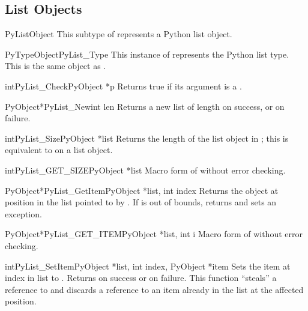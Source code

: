 \documentclass{manual}
\begin{document}
\subsection{List Objects \label{listObjects}}

\begin{ctypedesc}{PyListObject}
This subtype of  represents a Python list object.
\end{ctypedesc}

\begin{cvardesc}{PyTypeObject}{PyList_Type}
This instance of  represents the Python list
type.  This is the same object as .
\end{cvardesc}

\begin{cfuncdesc}{int}{PyList_Check}{PyObject *p}
Returns true if its argument is a .
\end{cfuncdesc}

\begin{cfuncdesc}{PyObject*}{PyList_New}{int len}
Returns a new list of length  on success, or \NULL{} on
failure.
\end{cfuncdesc}

\begin{cfuncdesc}{int}{PyList_Size}{PyObject *list}
Returns the length of the list object in ; this is
equivalent to  on a list object.
\end{cfuncdesc}

\begin{cfuncdesc}{int}{PyList_GET_SIZE}{PyObject *list}
Macro form of  without error checking.
\end{cfuncdesc}

\begin{cfuncdesc}{PyObject*}{PyList_GetItem}{PyObject *list, int index}
Returns the object at position  in the list pointed
to by .  If  is out of bounds, returns \NULL{} and
sets an  exception.
\end{cfuncdesc}

\begin{cfuncdesc}{PyObject*}{PyList_GET_ITEM}{PyObject *list, int i}
Macro form of  without error checking.
\end{cfuncdesc}

\begin{cfuncdesc}{int}{PyList_SetItem}{PyObject *list, int index,
                                       PyObject *item}
Sets the item at index  in list to .
Returns  on success or  on failure.
  This function ``steals'' a reference to  and
discards a reference to an item already in the list at the affected
position.
\end{cfuncdesc}
\end{document}
